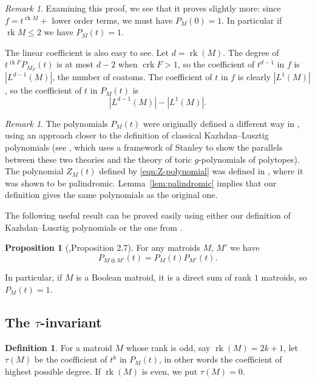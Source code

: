 \documentclass[12pt,reqno]{amsart}
\theoremstyle{definition}
\newtheorem{definition}[theorem]{Definition}
\newtheorem{proposition}[theorem]{Proposition}
\theoremstyle{remark}
\newtheorem{remark}[theorem]{Remark}
\newcommand{\crk}{\operatorname{crk}}
\newcommand{\rk}{\operatorname{rk}}
\renewcommand{\(}{\left(}
\renewcommand{\)}{\right)}
\newcommand{\<}{\left<}
\renewcommand{\>}{\right>}
\begin{document}
\begin{remark}
Examining this proof, we see that it proves slightly more: since $f = t^{\rk M} + $ lower order terms, we must have $P_M(0) = 1$.  In particular if $\rk M \le 2$ we have $P_M(t) = 1$.

The linear coefficient is also easy to see.  Let $d= \rk(M)$.  The degree of $t^{\rk F}P_{M_F}(t)$ is at most $d - 2$ when $\crk F > 1$, so the coefficient of $t^{d-1}$ in $f$ is $|L^{d-1}(M)|$, the number of coatoms.  The coefficient of $t$ in $f$ is clearly $|L^1(M)|$, so the coefficient of $t$ in $P_M(t)$ is
\[|L^{d-1}(M)| - |L^{1}(M)|.\]
\end{remark}

\begin{remark}
The polynomials $P_M(t)$ were originally defined a different way in \cite{EPW}, using an approach closer to the definition of classical Kazhdan--Lusztig polynomials (see \cite{P}, which uses a framework of Stanley to show the parallels between these two theories and the theory of toric $g$-polynomials of polytopes).  The polynomial $Z_M(t)$ defined by
 \eqref{eqn:Z-polynomial} was defined in 
 \cite{PXY}, where it was shown to be palindromic. Lemma~\ref{lem:palindromic} implies that our definition gives the same polynomials as the original one.   
\end{remark}

The following useful result can be proved easily using either our definition of Kazhdan--Lusztig polynomials or the one from \cite{EPW}.

\begin{proposition}[\cite{EPW},Proposition 2.7]\label{prop:direct sum}
For any matroids $M$, $M'$ we have
\[P_{M\oplus M'}(t)= P_{M}(t)P_{M'}(t).\]
\end{proposition}

In particular, if $M$ is a Boolean matroid, it is a direct sum of rank $1$ matroids, so $P_M(t) = 1$.

\subsection{The $\tau$-invariant}



\begin{definition}
For a matroid $M$ whose rank is odd, say $\rk(M) = 2k+1$, let $\tau(M)$ be the coefficient of $t^k$ in $P_M(t)$, in other words the coefficient of highest possible degree.  If $\rk(M)$ is even, we put $\tau(M) = 0$. 
\end{definition}
\end{document}

